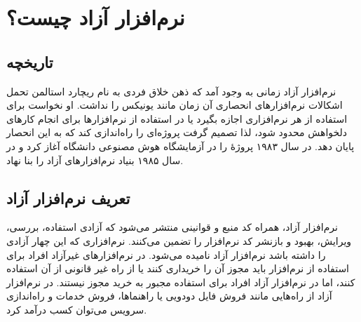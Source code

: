 \documentclass{article}
\begin{document}
\section{نرم‌افزار آزاد چیست؟}
\subsection{تاریخچه}
نرم‌افزار آزاد زمانی به وجود آمد که ذهن خلاق فردی به نام ریچارد استالمن تحمل اشکالات نرم‌افزارهای انحصاری آن زمان مانند یونیکس را نداشت. او نخواست برای استفاده از هر نرم‌افزاری اجازه بگیرد یا در استفاده از نرم‌افزارها برای انجام کار‌های دلخواهش محدود شود، لذا تصمیم گرفت پروژه‌ای را راه‌اندازی کند که به این انحصار پایان دهد. در سال ۱۹۸۳ پروژهٔ  را در آزمایشگاه هوش مصنوعی دانشگاه  آغاز کرد و در سال ۱۹۸۵ بنیاد نرم‌افزار‌های آزاد را بنا نهاد.

\subsection{تعریف نرم‌افزار آزاد}
نرم‌افزار آزاد، همراه کد منبع و قوانینی منتشر می‌شود که آزادی استفاده، بررسی، ویرایش، بهبود و بازنشر کد نرم‌افزار را تضمین می‌کنند. نرم‌افزاری که این چهار آزادی را داشته باشد نرم‌افزار آزاد نامیده می‌شود. در نرم‌افزارهای غیرآزاد افراد برای استفاده از نرم‌افزار باید مجوز آن را خریداری کنند یا از راه غیر قانونی از آن استفاده کنند، اما در نرم‌افزار آزاد افراد برای استفاده مجبور به خرید مجوز نیستند. در نرم‌افزار آزاد از راه‌هایی مانند فروش فایل دودویی یا راهنماها، فروش خدمات و راه‌اندازی سرویس می‌توان کسب درآمد کرد.
\end{document}

